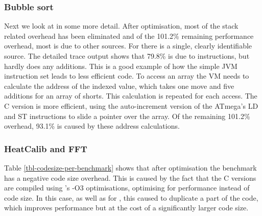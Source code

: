 \subsubsection{Bubble sort}
\label{sec-evaluation-bubble-sort}
Next we look at  in some more detail. After optimisation, most of the stack related overhead has been eliminated and of the 101.2\% remaining performance overhead, most is due to other sources. For  there is a single, clearly identifiable source. The detailed trace output shows that 79.8\% is due to  instructions, but  hardly does any additions. This is a good example of how the simple JVM instruction set leads to less efficient code. To access an array the VM needs to calculate the address of the indexed value, which takes one move and five additions for an array of shorts. This calculation is repeated for each access. The C version is more efficient, using the auto-increment version of the ATmega's LD and ST instructions to slide a pointer over the array. Of the remaining 101.2\% overhead, 93.1\% is caused by these address calculations.

%

\subsubsection{HeatCalib and FFT}
Table \ref{tbl-codesize-per-benchmark} shows that after optimisation the  benchmark has a negative code size overhead. This is caused by the fact that the C versions are compiled using 's -O3 optimisations, optimising for performance instead of code size. In this case, as well as for , this caused  to duplicate a part of the code, which improves performance but at the cost of a significantly larger code size.

